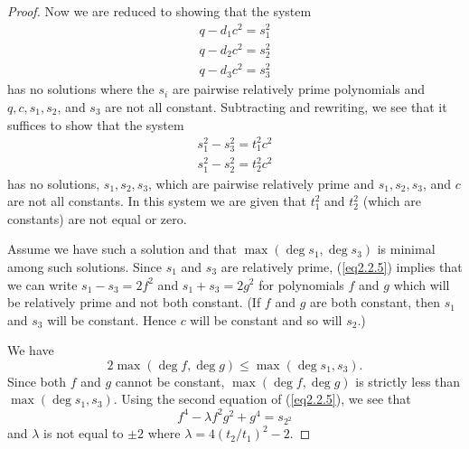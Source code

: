 \begin{proof}
Now we are reduced to showing that the system
\begin{equation}
\label{eq2.2.4}
\begin{split}
q-d_{1}c^{2}=s_{1}^{2}\\
q-d_{2}c^{2}=s_{2}^{2}\\
q-d_{3}c^{2}=s_{3}^{2}
\end{split}
\end{equation}
has no solutions where the $s_{i}$ are pairwise relatively prime polynomials and $q,c,s_{1},s_{2}$, and $s_{3}$ are not all constant. Subtracting and rewriting, we see that it suffices to show that the system
\begin{equation}
\label{eq2.2.5}
\begin{split}
s_{1}^{2}-s_{3}^{2}=t_{1}^{2}c^{2}\\
s_{1}^{2}-s_{2}^{2}=t_{2}^{2}c^{2}
\end{split}
\end{equation}
has no solutions, $s_{1},s_{2},s_{3}$, which are pairwise relatively prime and $s_{1},s_{2},s_{3}$, and $c$ are not all constants. In this system we are given that $t_{1}^{2}$ and $t_{2}^{2}$ (which are constants) are not equal or zero.

Assume we have such a solution and that $\max(\deg s_{1},\deg s_{3})$ is mini\-mal among such solutions. Since $s_{1}$ and $s_{3}$ are relatively prime, (\ref{eq2.2.5}) implies that we can write $s_{1}-s_{3}=2f^{2}$ and $s_{1}+s_{3}=2g^{2}$ for polynomials $f$ and $g$ which will be relatively prime and not both constant. (If $f$ and $g$ are both constant, then $s_{1}$ and $s_{3}$ will be constant. Hence $c$ will be constant and so will $s_{2}.$)

We have
\[
2 \max(\deg f,\deg g) \displaystyle \leq\max(\deg s_{1},s_{3}) .
\]
Since both $f$ and $g$ cannot be constant, $\max(\deg f,\deg g)$ is strictly less than $\max(\deg s_{1},s_{3})$. Using the second equation of (\ref{eq2.2.5}), we see that
\begin{equation}
\label{eq2.2.6}
f^{4}-\lambda f^{2}g^{2}+g^{4}=s_{2^{2}}
\end{equation}
and $\lambda$ is not equal to $\pm 2$ where $\lambda=4(t_{2}/t_{1})^{2}-2$.


\end{proof}
